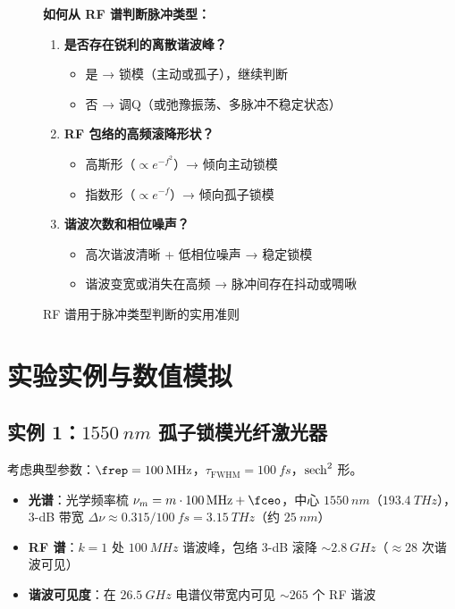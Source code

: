 \documentclass[11pt,a4paper]{article}
\begin{document}
\begin{figure}[htbp]
\centering
\begin{tcolorbox}[width=0.95\textwidth, colback=yellow!5, colframe=yellow!80, title=RF谱判断准则]
\textbf{如何从 RF 谱判断脉冲类型：}
\begin{enumerate}[leftmargin=*]
    \item \textbf{是否存在锐利的离散谐波峰？}
    \begin{itemize}
        \item 是 → 锁模（主动或孤子），继续判断
        \item 否 → 调Q（或弛豫振荡、多脉冲不稳定状态）
    \end{itemize}
    \item \textbf{RF 包络的高频滚降形状？}
    \begin{itemize}
        \item 高斯形（$\propto e^{-f^2}$）→ 倾向主动锁模
        \item 指数形（$\propto e^{-f}$）→ 倾向孤子锁模
    \end{itemize}
    \item \textbf{谐波次数和相位噪声？}
    \begin{itemize}
        \item 高次谐波清晰 + 低相位噪声 → 稳定锁模
        \item 谐波变宽或消失在高频 → 脉冲间存在抖动或啁啾
    \end{itemize}
\end{enumerate}
\end{tcolorbox}
\caption{RF 谱用于脉冲类型判断的实用准则}
\label{fig:rf_comparison_table}
\end{figure}

\section{实验实例与数值模拟}

\subsection{实例 1：$\SI{1550}{nm}$ 孤子锁模光纤激光器}

考虑典型参数：$\frep = \SI{100}{MHz}$，$\tau_{\text{FWHM}} = \SI{100}{fs}$，$\sech^2$ 形。

\begin{itemize}
    \item \textbf{光谱}：光学频率梳 $\nu_m = m \cdot \SI{100}{MHz} + \fceo$，中心 $\SI{1550}{nm}$（$\SI{193.4}{THz}$），
    3-dB 带宽 $\Delta\nu \approx 0.315/\SI{100}{fs} = \SI{3.15}{THz}$（约 $\SI{25}{nm}$）
    \item \textbf{RF 谱}：$k=1$ 处 $\SI{100}{MHz}$ 谐波峰，包络 3-dB 滚降 $\sim\SI{2.8}{GHz}$（$\approx 28$ 次谐波可见）
    \item \textbf{谐波可见度}：在 $\SI{26.5}{GHz}$ 电谱仪带宽内可见 $\sim 265$ 个 RF 谐波
\end{itemize}
\end{document}
